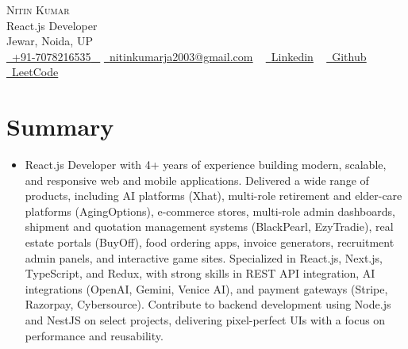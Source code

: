 \documentclass[letterpaper,11pt]{article}
\begin{document}

\begin{center}
    {\Huge \scshape Nitin Kumar} \\ \vspace{2pt}
    React.js Developer \\ \vspace{2pt}
    Jewar, Noida, UP \\ \vspace{2pt}
    \small \href{tel:+917078216535}{ \raisebox{-0.1\height}\faPhone\ \underline{+91-7078216535} ~} \href{mailto:nitinkumarja2003@gmail.com}{\raisebox{-0.2\height}\faEnvelope\  \underline{nitinkumarja2003@gmail.com}} ~
    \href{https://www.linkedin.com/in/nitin-kumar-42026421b}{\raisebox{-0.2\height}\faLinkedinSquare\ \underline{Linkedin}}  ~
    \href{https://github.com/nitinkumar2003}{\raisebox{-0.2\height}\faGithub\ \underline{Github}} ~
    \href{https://leetcode.com/u/Nitinjanmeda/}{\raisebox{-0.2\height}\faCode\ \underline{LeetCode}}
\end{center}
\vspace{0.5mm}

\section*{\textbf{Summary}}
\begin{itemize}[leftmargin=0.15in, label={}]
    \small\item{React.js Developer with 4+ years of experience building modern, scalable, and responsive web and mobile applications. Delivered a wide range of products, including AI platforms (Xhat), multi-role retirement and elder-care platforms (AgingOptions), e-commerce stores, multi-role admin dashboards, shipment and quotation management systems (BlackPearl, EzyTradie), real estate portals (BuyOff), food ordering apps, invoice generators, recruitment admin panels, and interactive game sites. Specialized in React.js, Next.js, TypeScript, and Redux, with strong skills in REST API integration, AI integrations (OpenAI, Gemini, Venice AI), and payment gateways (Stripe, Razorpay, Cybersource). Contribute to backend development using Node.js and NestJS on select projects, delivering pixel-perfect UIs with a focus on performance and reusability.}
\end{itemize}
\vspace{-6pt}

\end{document}
